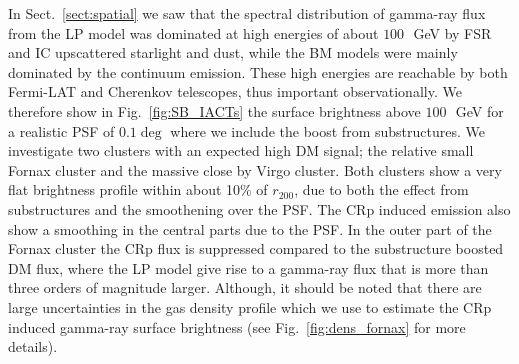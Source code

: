 \documentclass[10pt,aps,pra,reprint,amsmath,amsfonts,amssymb,showpacs,nofootinbib,floatfix]{revtex4-1}
\newcommand{\rvir}{r_{200}}
\begin{document}
In Sect.~\ref{sect:spatial} we saw that the spectral distribution of
gamma-ray flux from the LP model was dominated at high energies of
about $100\,$~GeV by FSR and IC upscattered starlight and dust, while
the BM models were mainly dominated by the continuum emission. These
high energies are reachable by both Fermi-LAT and Cherenkov
telescopes, thus important observationally. We therefore show in
Fig.~\ref{fig:SB_IACTs} the surface brightness above $100\,$~GeV for a
realistic PSF of $0.1\deg$ where we include the boost from
substructures. We investigate two clusters with an expected high DM
signal; the relative small Fornax cluster and the massive close by
Virgo cluster. Both clusters show a very flat brightness profile
within about 10\% of $\rvir$, due to both the effect from
substructures and the smoothening over the PSF. The CRp induced
emission also show a smoothing in the central parts due to the PSF. In
the outer part of the Fornax cluster the CRp flux is suppressed
compared to the substructure boosted DM flux, where the LP model give
rise to a gamma-ray flux that is more than three orders of magnitude
larger. Although, it should be noted that there are large
uncertainties in the gas density profile which we use to estimate the
CRp induced gamma-ray surface brightness (see
Fig.~\ref{fig:dens_fornax} for more details).
\end{document}
